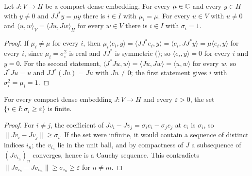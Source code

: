\begin{lemma}
\label{lem:gram-eigenvalue-index}
\leanok
{}
Let $J : V \to H$ be a compact dense embedding. For every $\mu \in \mathbb{C}$ and every $y \in H$ with
$y \neq 0$ and $J J^* y = \mu y$ there is $i \in I$ with $\mu_i = \mu$. For every $u \in V$ with
$u \neq 0$ and $\langle u, w \rangle_V = \langle J u, J w \rangle_H$ for every $w \in V$ there
is $i \in I$ with $\sigma_i = 1$.
\end{lemma}

\begin{proof}
\leanok
If $\mu_i \neq \mu$ for every $i$, then
$\mu_i \langle e_i, y \rangle = \langle J J^* e_i, y \rangle = \langle e_i, J J^* y \rangle
= \mu \langle e_i, y \rangle$ for every $i$, since $\mu_i = \sigma_i^2$ is real and $J J^*$ is
symmetric (); so $\langle e_i, y \rangle = 0$ for every $i$ and $y = 0$.
For the second statement, $\langle J^* J u, w \rangle = \langle J u, J w \rangle
= \langle u, w \rangle$ for every $w$, so $J^* J u = u$ and $J J^* (J u) = J u$ with
$J u \neq 0$; the first statement gives $i$ with $\sigma_i^2 = \mu_i = 1$.
\end{proof}

\begin{lemma}
\label{lem:finite-large-singular-values}
\leanok
{}
For every compact dense embedding $J : V \to H$ and every $\varepsilon > 0$, the set
$\{i \in I : \sigma_i \geq \varepsilon\}$ is finite.
\end{lemma}

\begin{proof}
\leanok
For $i \neq j$, the coefficient of $J v_i - J v_j = \sigma_i e_i - \sigma_j e_j$ at $e_i$ is
$\sigma_i$, so $\|J v_i - J v_j\| \geq \sigma_i$. If the set were infinite, it would contain a
sequence of distinct indices $i_n$; the $v_{i_n}$ lie in the unit ball, and by compactness of
$J$ a subsequence of $(J v_{i_n})_n$ converges, hence is a Cauchy sequence. This contradicts
$\|J v_{i_n} - J v_{i_m}\| \geq \sigma_{i_n} \geq \varepsilon$ for $n \neq m$.
\end{proof}

